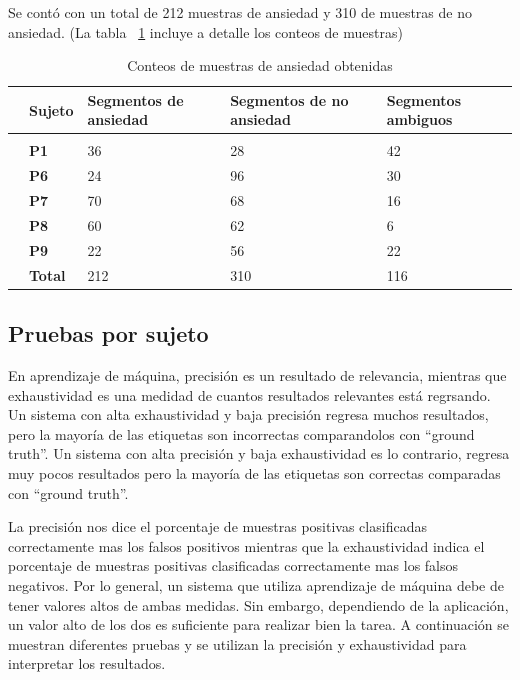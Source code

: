 Se cont\'o con un total de 212 muestras de ansiedad y 310 de muestras de no ansiedad. (La tabla ~\ref{tab:anxietycounts} incluye a detalle los conteos de muestras)
\begin{table}[h!]
        \footnotesize
        \centering
        \caption{Conteos de muestras de ansiedad obtenidas}
\label{tab:anxietycounts}
        \begin{tabular}{m{.2cm}m{2.5cm}m{2.5cm}m{2.5cm}m{2.5cm}}
                \hline\noalign{\smallskip}
    &\textbf{Sujeto}&\textbf{Segmentos de ansiedad}&\textbf{Segmentos de no ansiedad}&\textbf{Segmentos ambiguos}\\
        \hline
 \\\noalign{\smallskip}
                &\textbf{P1}&36&28&42\\
                &\textbf{P6}&24&96&30\\
                &\textbf{P7}&70&68&16\\
                &\textbf{P8}&60&62&6\\
                &\textbf{P9}&22&56&22\\
                &\textbf{Total}&212&310&116
    \end{tabular}
\end{table}
\subsection{Pruebas por sujeto}
En aprendizaje de m\'aquina, precisi\'on es un resultado de relevancia, mientras que exhaustividad es una medidad de cuantos resultados relevantes est\'a regrsando. Un sistema con alta exhaustividad y baja precisi\'on regresa muchos resultados, pero la mayor\'ia de las etiquetas son incorrectas comparandolos con ``ground truth''. Un sistema con alta precisi\'on y baja exhaustividad es lo contrario, regresa muy pocos resultados pero la mayor\'ia de las etiquetas son correctas comparadas con ``ground truth''.

 La precisi\'on nos dice el porcentaje de muestras positivas clasificadas correctamente mas los falsos positivos mientras que la exhaustividad indica el porcentaje de muestras positivas clasificadas correctamente mas los falsos negativos. Por lo general, un sistema que utiliza aprendizaje de m\'aquina debe de tener valores altos de ambas medidas. Sin embargo, dependiendo de la aplicaci\'on, un valor alto de los dos es suficiente para realizar bien la tarea. A continuaci\'on se muestran diferentes pruebas y se utilizan la precisi\'on y exhaustividad para interpretar los resultados.

